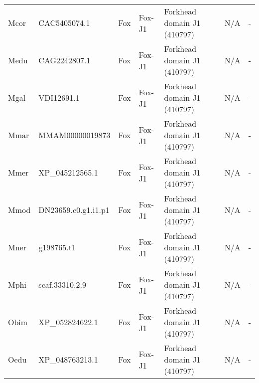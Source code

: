 \documentclass[../main.tex]{subfiles}
\begin{document}
\begin{landscape}
\begin{longtable}{lllllll}
		Mcor           & CAC5405074.1          & Fox            & Fox-J1              & Forkhead domain J1 (410797)                 & N/A                                                                    & -                    \\
		Medu           & CAG2242807.1          & Fox            & Fox-J1              & Forkhead domain J1 (410797)                 & N/A                                                                    & -                    \\
		Mgal           & VDI12691.1            & Fox            & Fox-J1              & Forkhead domain J1 (410797)                 & N/A                                                                    & -                    \\
		Mmar           & MMAM00000019873       & Fox            & Fox-J1              & Forkhead domain J1 (410797)                 & N/A                                                                    & -                    \\
		Mmer           & XP\_045212565.1       & Fox            & Fox-J1              & Forkhead domain J1 (410797)                 & N/A                                                                    & -                    \\
		Mmod           & DN23659.c0.g1.i1.p1   & Fox            & Fox-J1              & Forkhead domain J1 (410797)                 & N/A                                                                    & -                    \\
		Mner           & g198765.t1            & Fox            & Fox-J1              & Forkhead domain J1 (410797)                 & N/A                                                                    & -                    \\
		Mphi           & scaf.33310.2.9        & Fox            & Fox-J1              & Forkhead domain J1 (410797)                 & N/A                                                                    & -                    \\
		Obim           & XP\_052824622.1       & Fox            & Fox-J1              & Forkhead domain J1 (410797)                 & N/A                                                                    & -                    \\
		Oedu           & XP\_048763213.1       & Fox            & Fox-J1              & Forkhead domain J1 (410797)                 & N/A                                                                    & -                    \\

\end{longtable}
\end{landscape}
\end{document}
